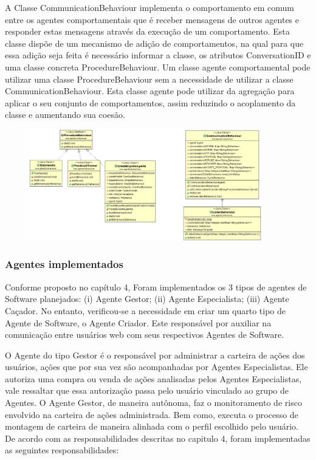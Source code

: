 \begin{apendicesenv}
A Classe CommunicationBehaviour implementa o comportamento em comum entre os agentes comportamentais que é receber mensagens de outros agentes e responder estas mensagens através da execução de um comportamento. Esta classe dispõe de um mecanismo de adição de comportamentos, na qual para que essa adição seja feita é necessário informar a classe, os atributos ConversationID e uma classe concreta ProcedureBehaviour. Um classe agente comportamental pode utilizar uma classe ProcedureBehaviour sem a necessidade de utilizar a classe CommunicationBehaviour. Esta classe agente pode utilizar da agregação para aplicar o seu conjunto de comportamentos, assim reduzindo o acoplamento da classe e aumentando sua coesão.

\begin{figure}[h]
\centering
\label{f4}
\includegraphics[width=0.9\textwidth]{figuras/pacoteBehaviours}
\end{figure}

\subsubsection{Agentes implementados}

Conforme proposto no capítulo 4, Foram implementados os 3 tipos de agentes de Software planejados: (i) Agente Gestor; (ii) Agente Especialista; (iii) Agente Caçador. No entanto, verificou-se a necessidade em criar um quarto tipo de Agente de Software, o Agente Criador. Este responsável por auxiliar na comunicação entre usuários web com seus respectivos Agentes de Software. 


O Agente do tipo Gestor é o responsável por administrar a carteira de ações dos usuários, ações que por sua vez são acompanhadas por Agentes Especialistas. Ele autoriza uma compra ou venda de ações analisadas pelos Agentes Especialistas, vale ressaltar que essa autorização passa pelo usuário vinculado ao grupo de Agentes. O Agente Gestor, de maneira autônoma, faz o monitoramento de risco envolvido na carteira de ações administrada. Bem como, executa o processo de montagem de carteira de maneira alinhada com o perfil escolhido pelo usuário. De acordo com as responsabilidades descritas no capitulo 4, foram implementadas as seguintes responsabilidades: 


\end{apendicesenv}
